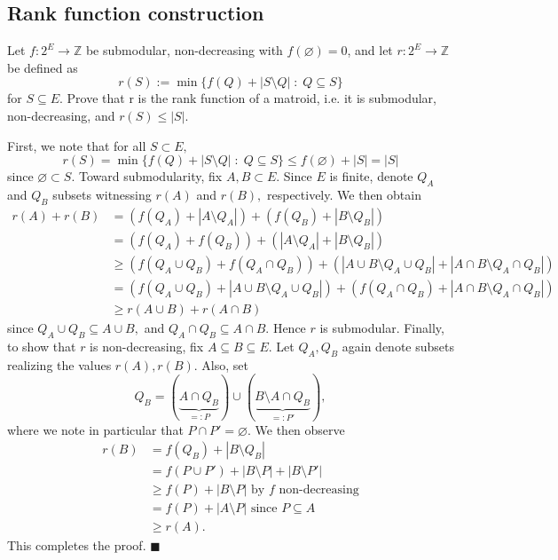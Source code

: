 \documentclass{article}
\let\emptyset\varnothing
\newcommand{\Z}{\mathbb{Z}}
\begin{document}
  \subsection{Rank function construction}
  \begin{centerframebox}
    Let $f: 2^E \to \Z$ be submodular, non-decreasing with $f(\emptyset) = 0$, and let $r: 2^E \to \Z$ be defined as
    \[ r(S) := \min\{f(Q)+|S\setminus Q| \;:\; Q\subseteq S\} \]
    for $S \subseteq E$. Prove that r is the rank function of a matroid, i.e. it is submodular, non-decreasing, and $r(S) \leq |S|$.
  \end{centerframebox}
  First, we note that for all $S\subset E,$
  $$r(S)=\min\{f(Q)+|S\setminus Q| \;:\; Q\subseteq S\}\leq f(\emptyset)+|S|=|S|$$since $\emptyset\subset S.$ Toward submodularity, fix $A,B\subset E.$ Since $E$ is finite, denote $Q_A$ and $Q_B$ subsets witnessing $r(A)$ and $r(B),$ respectively. We then obtain
  \begin{align*}
      r(A)+r(B)&=\left(f(Q_A)+|A\setminus Q_A|\right)+\left(f(Q_B)+|B\setminus Q_B|\right)\\&=\left(f(Q_A)+f(Q_B)\right)+\left(|A\setminus Q_A|+|B\setminus Q_B|\right)\\&\geq \left(f(Q_A\cup Q_B)+f(Q_A\cap Q_B)\right)+\left(|A\cup B\setminus Q_A\cup Q_B|+|A\cap B\setminus Q_A\cap Q_B|\right)\\&=\left(f(Q_A\cup Q_B)+|A\cup B\setminus Q_A\cup Q_B|\right)+\left(f(Q_A\cap Q_B)+|A\cap B\setminus Q_A\cap Q_B|\right)\\&\geq r(A\cup B)+r(A\cap B)
  \end{align*}since $Q_A\cup Q_B\subseteq A\cup B,$ and $Q_A\cap Q_B\subseteq A\cap B.$ Hence $r$ is submodular. Finally, to show that $r$ is non-decreasing, fix $A\subseteq B\subseteq E.$ Let $Q_A,Q_B$ again denote subsets realizing the values $r(A),r(B).$ Also, set $$Q_B=(\underbrace{A\cap Q_B}_{=:P})\cup (\underbrace{B\setminus A\cap Q_B}_{=:P'}),$$where we note in particular that $P\cap P'=\emptyset.$ We then observe
  \begin{align*}
      r(B)&=f(Q_B)+|B\setminus Q_B|\\&=f(P\cup P')+|B\setminus P|+|B\setminus P'|\\&\geq f(P)+|B\setminus P| \text{ by }f\text{ non-decreasing}\\&=f(P)+|A\setminus P|\text{ since }P\subseteq A\\&\geq r(A).
  \end{align*}This completes the proof. $\blacksquare$
\end{document}
